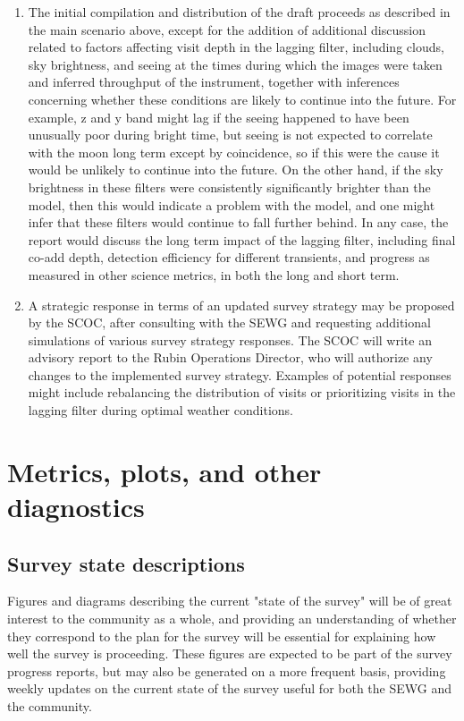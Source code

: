 \begin{description}
\begin{description}
\begin{enumerate}
\item The initial compilation and distribution of the draft proceeds as described in the main scenario above, except for the addition of additional discussion related to factors affecting visit depth in the lagging filter, including clouds, sky brightness, and seeing at the times during which the images were taken and inferred throughput of the instrument, together with inferences concerning whether these conditions are likely to continue into the future. For example, z and y band might lag if the seeing happened to have been unusually poor during bright time, but seeing is not expected to correlate with the moon long term except by coincidence, so if this were the cause it would be unlikely to continue into the future. On the other hand, if the sky brightness in these filters were consistently significantly brighter than the model, then this would indicate a problem with the model, and one might infer that these filters would continue to fall further behind. In any case, the report would discuss the long term impact of the lagging filter, including final co-add depth, detection efficiency for different transients, and progress as measured in other science metrics, in both the long and short term.
\item A strategic response in terms of an updated survey strategy may be proposed by the SCOC, after consulting with the SEWG and requesting additional simulations of various survey strategy responses. The SCOC will write an advisory report to the Rubin Operations Director, who will authorize any changes to the implemented survey strategy.  Examples of potential responses might include rebalancing the distribution of visits or prioritizing visits in the lagging filter during optimal weather conditions.
\end{enumerate}
\end{description}
\end{description}


\section{Metrics, plots, and other diagnostics}
\label{sec:org3b975f0}

\subsection{Survey state descriptions}
\label{sec:orgda9e383}
Figures and diagrams describing the current "state of the survey" will be of great interest to the community as a whole, and providing an understanding of whether they correspond to the plan for the survey will be essential for explaining how well the survey is proceeding. These figures are expected to be part of the survey progress reports, but may also be generated on a more frequent basis, providing weekly updates on the current state of the survey useful for both the SEWG and the community.  

